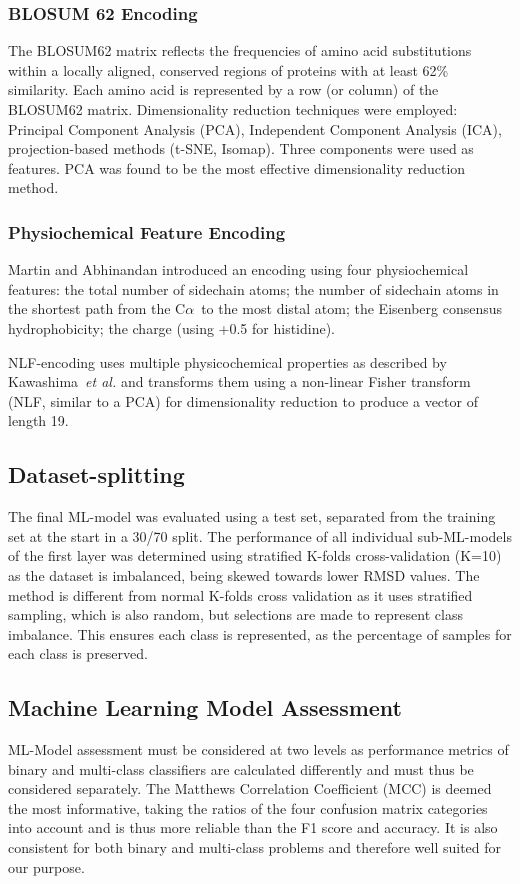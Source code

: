 \documentclass[12pt]{article}
\newcommand{\ca}{\mbox{C$\alpha$}}
\newcommand{\etal}{~\emph{et al.}}
\let\shortcite\cite
\begin{document}
\subsubsection{BLOSUM 62 Encoding}
The BLOSUM62 matrix reflects the frequencies of amino acid
substitutions within a locally aligned, conserved regions of proteins
with at least 62\% similarity. Each amino acid is represented by a row
(or column) of the BLOSUM62 matrix. Dimensionality reduction
techniques were employed: Principal Component Analysis (PCA),
Independent Component Analysis (ICA), projection-based methods (t-SNE,
Isomap). Three components were used as features. PCA was found to be the most effective dimensionality reduction method. 

\subsubsection{Physiochemical Feature Encoding}
Martin and Abhinandan\shortcite{Abhinandan2010} introduced an encoding using
four physiochemical features:
the total number of sidechain atoms; the
number of sidechain atoms in the shortest path from the \ca\ to the most
distal atom; the Eisenberg consensus
hydrophobicity\cite{Eisenberg1982}; the charge (using +0.5 for histidine).

NLF-encoding \shortcite{Nanni2011} uses multiple physicochemical
properties as described by Kawashima\etal\shortcite{Kawashima2000} and
transforms them using a non-linear Fisher transform (NLF, similar to a
PCA) for dimensionality reduction to produce a vector of length 19.


\subsection{Dataset-splitting}
The final ML-model was evaluated using a test set, separated from the
training set at the start in a 30/70 split. The performance of all individual sub-ML-models of the first layer was determined using stratified K-folds cross-validation (K=10) as the
dataset is imbalanced, being skewed towards lower RMSD values\cite{Krstajic2014,Kohavi1995}. The
method is different from normal K-folds cross validation as it uses
stratified sampling, which is also random, but selections are made to represent class imbalance.
This ensures each class is represented, as the percentage of samples for each class is
preserved.

\subsection{Machine Learning Model Assessment} 
ML-Model assessment must be considered at two levels as performance
metrics of binary and multi-class classifiers are calculated
differently and must thus be considered separately. The Matthews
Correlation Coefficient (MCC)\cite{Chicco2020} is deemed the most
informative, taking the ratios of the four confusion matrix categories
into account and is thus more reliable than the F1 score and
accuracy. It is also consistent for both binary and multi-class
problems and therefore well suited for our purpose.\cite{Jurman2012}
\end{document}
